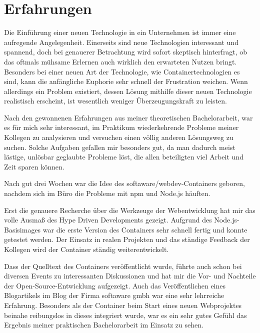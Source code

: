 \chapter{Erfahrungen}
\label{cha:experience}
Die Einführung einer neuen Technologie in ein Unternehmen ist immer eine aufregende Angelegenheit.
Einerseits sind neue Technologien interessant und spannend, doch bei genauerer Betrachtung wird sofort skeptisch hinterfragt, ob das oftmals mühsame Erlernen auch wirklich den erwarteten Nutzen bringt.
Besonders bei einer neuen Art der Technologie, wie Containertechnologien es sind, kann die anfängliche Euphorie sehr schnell der Frustration weichen.
Wenn allerdings ein Problem existiert, dessen Lösung mithilfe dieser neuen Technologie realistisch erscheint, ist wesentlich weniger Überzeugungskraft zu leisten.

Nach den gewonnenen Erfahrungen aus meiner theoretischen Bachelorarbeit, war es für mich sehr interessant, im Praktikum wiederkehrende Probleme meiner Kollegen zu analysieren und versuchen einen völlig anderen Lösungsweg zu suchen.
Solche Aufgaben gefallen mir besonders gut, da man dadurch meist lästige, unlösbar geglaubte Probleme löst, die allen beteiligten viel Arbeit und Zeit sparen können.

Nach gut drei Wochen war die Idee des softaware/webdev-Containers geboren, nachdem sich im Büro die Probleme mit npm und Node.js häuften.

Erst die genauere Recherche über die Werkzeuge der Webentwicklung hat mir das volle Ausmaß des Hype Driven Developments gezeigt.
Aufgrund des Node.js-Basisimages war die erste Version des Containers sehr schnell fertig und konnte getestet werden.
Der Einsatz in realen Projekten und das ständige Feedback der Kollegen wird der Container ständig weiterentwickelt.

Dass der Quelltext des Containers veröffentlicht wurde, führte auch schon bei diversen Events zu interessanten Diskussionen und hat mir die Vor- und Nachteile der Open-Source-Entwicklung aufgezeigt.
Auch das Veröffentlichen eines Blogartikels im Blog der Firma softaware gmbh war eine sehr lehrreiche Erfahrung.
Besonders als der Container beim Start eines neuen Webprojektes beinahe reibungslos in dieses integriert wurde, war es ein sehr gutes Gefühl das Ergebnis meiner praktischen Bachelorarbeit im Einsatz zu sehen.
